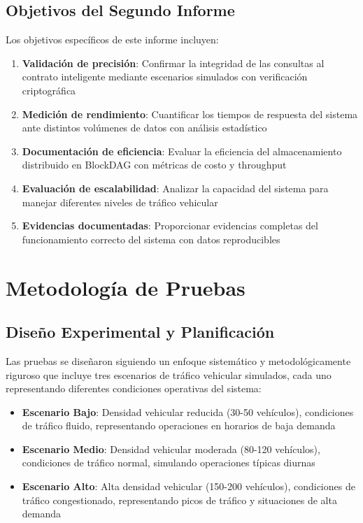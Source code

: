 \documentclass[onecolumn]{article}
\begin{document}
\subsection{Objetivos del Segundo Informe}

Los objetivos específicos de este informe incluyen:

\begin{enumerate}
    \item \textbf{Validación de precisión}: Confirmar la integridad de las consultas al contrato inteligente mediante escenarios simulados con verificación criptográfica
    \item \textbf{Medición de rendimiento}: Cuantificar los tiempos de respuesta del sistema ante distintos volúmenes de datos con análisis estadístico
    \item \textbf{Documentación de eficiencia}: Evaluar la eficiencia del almacenamiento distribuido en BlockDAG con métricas de costo y throughput
    \item \textbf{Evaluación de escalabilidad}: Analizar la capacidad del sistema para manejar diferentes niveles de tráfico vehicular
    \item \textbf{Evidencias documentadas}: Proporcionar evidencias completas del funcionamiento correcto del sistema con datos reproducibles
\end{enumerate}

\section{Metodología de Pruebas}

\subsection{Diseño Experimental y Planificación}

Las pruebas se diseñaron siguiendo un enfoque sistemático y metodológicamente riguroso que incluye tres escenarios de tráfico vehicular simulados, cada uno representando diferentes condiciones operativas del sistema:

\begin{itemize}
    \item \textbf{Escenario Bajo}: Densidad vehicular reducida (30-50 vehículos), condiciones de tráfico fluido, representando operaciones en horarios de baja demanda
    \item \textbf{Escenario Medio}: Densidad vehicular moderada (80-120 vehículos), condiciones de tráfico normal, simulando operaciones típicas diurnas
    \item \textbf{Escenario Alto}: Alta densidad vehicular (150-200 vehículos), condiciones de tráfico congestionado, representando picos de tráfico y situaciones de alta demanda
\end{itemize}
\end{document}
